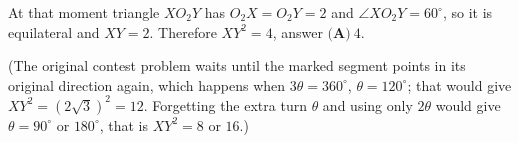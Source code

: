 At that moment triangle $XO_2Y$ has $O_2X=O_2Y=2$ and $\angle XO_2Y=60^\circ$, so it is equilateral and $XY=2$. Therefore $XY^2=4$, answer $\boxed{\textbf{(A)}\ 4}$.

(The original contest problem waits until the marked segment points in its original direction again, which happens when $3\theta=360^\circ$, $\theta=120^\circ$; that would give $XY^2=\left(2\sqrt3\right)^2=12$. Forgetting the extra turn $\theta$ and using only $2\theta$ would give $\theta=90^\circ$ or $180^\circ$, that is $XY^2=8$ or $16$.)
